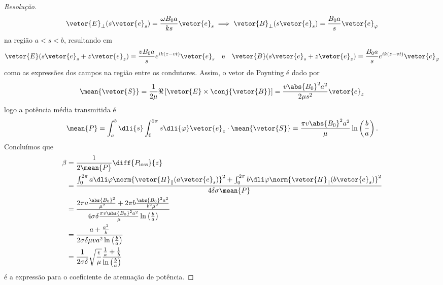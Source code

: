 \begin{proof}[Resolução]
    \begin{equation*}
        \vetor{E}_\perp(s \vetor{e}_s) = \frac{\omega B_0a}{k s}\vetor{e}_s \implies
        \vetor{B}_\perp(s\vetor{e}_s) = \frac{B_0 a}{s} \vetor{e}_\varphi
    \end{equation*}
    na região \(a < s < b\), resultando em
    \begin{equation*}
        \vetor{E}(s \vetor{e}_s + z \vetor{e}_z) = \frac{v B_0 a}{s} e^{i k(z - vt)}\vetor{e}_s
        \quad\text{e}\quad
        \vetor{B}(s \vetor{e}_s + z \vetor{e}_z) = \frac{B_0 a}{s} e^{i k(z - vt)}\vetor{e}_\varphi
    \end{equation*}
    como as expressões dos campos na região entre os condutores. Assim, o vetor de Poynting é dado por
    \begin{equation*}
        \mean{\vetor{S}} = \frac1{2\mu} \Re\left[\vetor{E} \times \conj{\vetor{B}}\right] = \frac{v \abs{B_0}^2 a^2}{2\mu s^2} \vetor{e}_z
    \end{equation*}
    logo a potência média transmitida é
    \begin{equation*}
        \mean{P} = \int_a^b \dli{s} \int_0^{2\pi} s\dli{\varphi} \vetor{e}_z \cdot \mean{\vetor{S}} = \frac{\pi v \abs{B_0}^2 a^2}{\mu} \ln\left(\frac{b}{a}\right).
    \end{equation*}
    Concluímos que 
    \begin{align*}
        \beta &= \frac{1}{2\mean{P}} \diff{P_\mathrm{loss}}{z}\\
              &= \frac{\int_0^{2\pi} a \dli\varphi \norm{\vetor{H}_\parallel(a\vetor{e}_s)}^2 + \int_0^{2\pi} b \dli\varphi \norm{\vetor{H}_\parallel(b \vetor{e}_s)}^2}{4 \delta \sigma \mean{P}}\\
              &= \frac{2\pi a \frac{\abs{B_0}^2}{\mu^2} + 2\pi b\frac{\abs{B_0}^2a^2}{b^2\mu^2}}{4 \sigma \delta \frac{\pi v \abs{B_0}^2 a^2}{\mu} \ln\left(\frac{b}{a}\right)}\\
              &= \frac{a + \frac{a^2}{b}}{2 \sigma \delta \mu v a^2 \ln\left(\frac{b}{a}\right)}\\
              &= \frac{1}{2 \sigma \delta}\sqrt{\frac{\epsilon}{\mu}}\frac{\frac1a + \frac1b}{\ln\left(\frac{b}{a}\right)}
    \end{align*}
    é a expressão para o coeficiente de atenuação de potência.
\end{proof}

